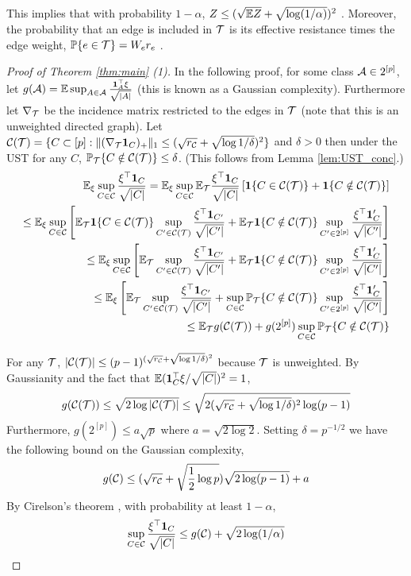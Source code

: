 This implies that with probability $1 - \alpha$, $Z \le (\sqrt{\mathbb{E} Z} + \sqrt{\log (1 / \alpha)})^2$ \cite{sharpnack2012detecting}.
Moreover, the probability that an edge is included in ${\mathcal{T}}$ is its effective resistance times the edge weight, $\mathbb{P} \{e \in {\mathcal{T}} \} = W_e r_e$ \cite{lyons2000probability}.

\begin{proof}[Proof of Theorem \ref{thm:main} (1)]

In the following proof, for some class $\mathcal{A} \in 2^{[p]}$, let $g(\mathcal{A}) = \mathbb{E} \sup_{A \in \mathcal{A}} \frac{{\bf 1}_A^\top \xi}{\sqrt{|A|}}$ (this is known as a Gaussian complexity).
Furthermore let $\nabla_{\mathcal{T}}$ be the incidence matrix restricted to the edges in ${\mathcal{T}}$ (note that this is an unweighted directed graph).
Let $\mathcal{C}({\mathcal{T}}) = \{C \subset [p] : \|(\nabla_{\mathcal{T}} {\bf 1}_C)_+\|_1 \le (\sqrt{r_{\mathcal{C}}} + \sqrt{\log 1/\delta})^2 \}$ and $\delta > 0$ then under the UST for any $C$, $\mathbb{P}_{\mathcal{T}} \{C \notin \mathcal{C}({\mathcal{T}})\} \le \delta$. (This follows from Lemma \ref{lem:UST_conc}.)
\[
\begin{aligned}
\mathbb{E}_\xi \sup_{C \in \mathcal{C}} \frac{\xi^\top {\bf 1}_C}{\sqrt{|C|}} = \mathbb{E}_\xi \sup_{C \in \mathcal{C}} \mathbb{E}_{\mathcal{T}}  \frac{\xi^\top {\bf 1}_C}{\sqrt{|C|}} \left[ {\bf 1}\{ C \in \mathcal{C}({\mathcal{T}}) \} + {\bf 1}\{ C \notin \mathcal{C}({\mathcal{T}}) \} \right] \\
\le \mathbb{E}_\xi \sup_{C \in \mathcal{C}} \left[ \mathbb{E}_{\mathcal{T}} {\bf 1}\{ C \in \mathcal{C}({\mathcal{T}}) \} \sup_{C' \in \mathcal{C}({\mathcal{T}})}  \frac{\xi^\top {\bf 1}_{C'}}{\sqrt{|C'|}}
+ \mathbb{E}_{\mathcal{T}} {\bf 1}\{ C \notin \mathcal{C}({\mathcal{T}}) \} \sup_{C' \in 2^{[p]}} \frac{\xi^\top {\bf 1}_C'}{\sqrt{|C'|}} \right]\\
\le \mathbb{E}_\xi \sup_{C \in \mathcal{C}} \left[ \mathbb{E}_{\mathcal{T}} \sup_{C' \in \mathcal{C}({\mathcal{T}})}  \frac{\xi^\top {\bf 1}_{C'}}{\sqrt{|C'|}}
+ \mathbb{E}_{\mathcal{T}} {\bf 1}\{ C \notin \mathcal{C}({\mathcal{T}}) \} \sup_{C' \in 2^{[p]}} \frac{\xi^\top {\bf 1}_C'}{\sqrt{|C'|}} \right]\\
\le \mathbb{E}_\xi  \left[ \mathbb{E}_{\mathcal{T}} \sup_{C' \in \mathcal{C}({\mathcal{T}})}  \frac{\xi^\top {\bf 1}_{C'}}{\sqrt{|C'|}}
+ \sup_{C \in \mathcal{C}} \mathbb{P}_{\mathcal{T}} \{ C \notin \mathcal{C}({\mathcal{T}}) \} \sup_{C' \in 2^{[p]}} \frac{\xi^\top {\bf 1}_C'}{\sqrt{|C'|}} \right]\\
\le \mathbb{E}_{\mathcal{T}} g(\mathcal{C}({\mathcal{T}})) + g(2^{[p]}) \sup_{C \in \mathcal{C}} \mathbb{P}_{\mathcal{T}} \{ C \notin \mathcal{C}({\mathcal{T}}) \} 
\end{aligned}
\]

For any ${\mathcal{T}}$, $|\mathcal{C}({\mathcal{T}})| \le (p - 1)^{(\sqrt{r_{\mathcal{C}}} + \sqrt{\log 1/\delta})^2}$ because ${\mathcal{T}}$ is unweighted.
By Gaussianity and the fact that $\mathbb{E} ({\bf 1}_C^\top \xi / \sqrt{|C|})^2 = 1$,
\[
g(\mathcal{C}({\mathcal{T}})) \le \sqrt{2 \log |\mathcal{C}({\mathcal{T}})|} \le \sqrt{2 (\sqrt{r_{\mathcal{C}}} + \sqrt{\log 1/\delta})^2 \log (p-1)}
\]
Furthermore, $g(2^{[p]}) \le a \sqrt{p}$ where $a = \sqrt{2 \log 2}$.
Setting $\delta = p^{-1/2}$ we have the following bound on the Gaussian complexity,
\[
g(\mathcal{C}) \le (\sqrt{r_{\mathcal{C}}} + \sqrt{\frac{1}{2} \log p})\sqrt{2 \log (p-1)} + a
\]
By Cirelson's theorem \cite{ledoux2001concentration}, with probability at least $1 - \alpha$,
\[
\sup_{C \in \mathcal{C}} \frac{\xi^\top {\bf 1}_C}{\sqrt{|C|}} \le g(\mathcal{C}) + \sqrt{2 \log (1 / \alpha)}
\]
\end{proof}


